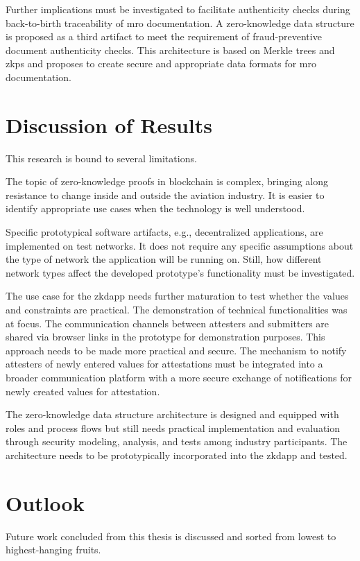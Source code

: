 Further implications must be investigated to facilitate authenticity checks during back-to-birth traceability of \acrshort{mro} documentation. A zero-knowledge data structure is proposed as a third artifact to meet the requirement of fraud-preventive document authenticity checks. This architecture is based on Merkle trees and \acrshort{zkp}s and proposes to create secure and appropriate data formats for \acrshort{mro} documentation.

\section{Discussion of Results}
This research is bound to several limitations. 

The topic of zero-knowledge proofs in blockchain is complex, bringing along resistance to change inside and outside the aviation industry. It is easier to identify appropriate use cases when the technology is well understood.

Specific prototypical software artifacts, e.g., decentralized applications,  are implemented on test networks. It does not require any specific assumptions about the type of network the application will be running on. Still, how different network types affect the developed prototype's functionality must be investigated.

The use case for the \acrshort{zkdapp} needs further maturation to test whether the values and constraints are practical. The demonstration of technical functionalities was at focus. The communication channels between attesters and submitters are shared via browser links in the prototype for demonstration purposes. This approach needs to be made more practical and secure. The mechanism to notify attesters of newly entered values for attestations must be integrated into a broader communication platform with a more secure exchange of notifications for newly created values for attestation.

The zero-knowledge data structure architecture is designed and equipped with roles and process flows but still needs practical implementation and evaluation through security modeling, analysis, and tests among industry participants. The architecture needs to be prototypically incorporated into the \acrshort{zkdapp} and tested.
 
\section{Outlook}
Future work concluded from this thesis is discussed and sorted from lowest to highest-hanging fruits.

